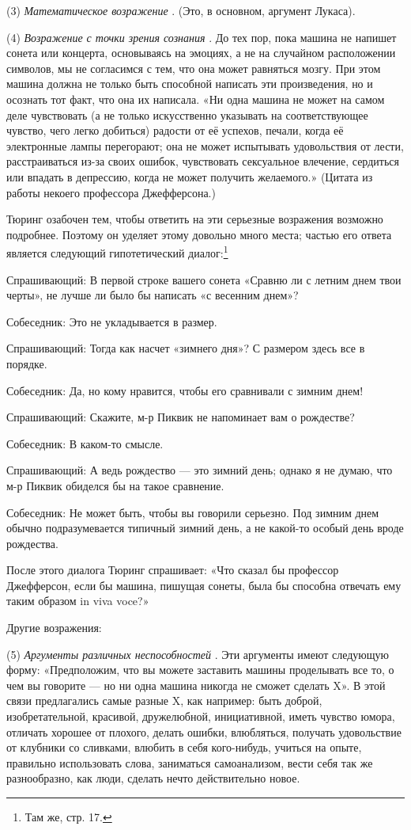 \documentclass[../main.tex]{subfiles}
\begin{document}
(3) \emph{Математическое возражение} . (Это, в основном, аргумент Лукаса).

(4) \emph{Возражение с точки зрения сознания} . До тех пор, пока машина не напишет сонета или концерта, основываясь на эмоциях, а не на случайном расположении символов, мы не согласимся с тем, что она может равняться мозгу. При этом машина должна не только быть способной написать эти произведения, но и осознать тот факт, что она их написала. «Ни одна машина не может на самом деле чувствовать (а не только искусственно указывать на соответствующее чувство, чего легко добиться) радости от её успехов, печали, когда её электронные лампы перегорают; она не может испытывать удовольствия от лести, расстраиваться из-за своих ошибок, чувствовать сексуальное влечение, сердиться или впадать в депрессию, когда не может получить желаемого.» (Цитата из работы некоего профессора Джефферсона.)

Тюринг озабочен тем, чтобы ответить на эти серьезные возражения возможно подробнее. Поэтому он уделяет этому довольно много места; частью его ответа является следующий гипотетический диалог:\footnote{Там же, стр. 17.}

Спрашивающий: В первой строке вашего сонета «Сравню ли с летним днем твои черты», не лучше ли было бы написать «с весенним днем»?

Собеседник: Это не укладывается в размер.

Спрашивающий: Тогда как насчет «зимнего дня»? С размером здесь все в порядке.

Собеседник: Да, но кому нравится, чтобы его сравнивали с зимним днем!

Спрашивающий: Скажите, м-р Пиквик не напоминает вам о рождестве?

Собеседник: В каком-то смысле.

Спрашивающий: А ведь рождество --- это зимний день; однако я не думаю, что м-р Пиквик обиделся бы на такое сравнение.

Собеседник: Не может быть, чтобы вы говорили серьезно. Под зимним днем обычно подразумевается типичный зимний день, а не какой-то особый день вроде рождества.

После этого диалога Тюринг спрашивает: «Что сказал бы профессор Джефферсон, если бы машина, пишущая сонеты, была бы способна отвечать ему таким образом in viva voce?»

Другие возражения:

(5) \emph{Аргументы различных неспособностей} . Эти аргументы имеют следующую форму: «Предположим, что вы можете заставить машины проделывать все то, о чем вы говорите --- но ни одна машина никогда не сможет сделать X». В этой связи предлагались самые разные X, как например: быть доброй, изобретательной, красивой, дружелюбной, инициативной, иметь чувство юмора, отличать хорошее от плохого, делать ошибки, влюбляться, получать удовольствие от клубники со сливками, влюбить в себя кого-нибудь, учиться на опыте, правильно использовать слова, заниматься самоанализом, вести себя так же разнообразно, как люди, сделать нечто действительно новое.
\end{document}
